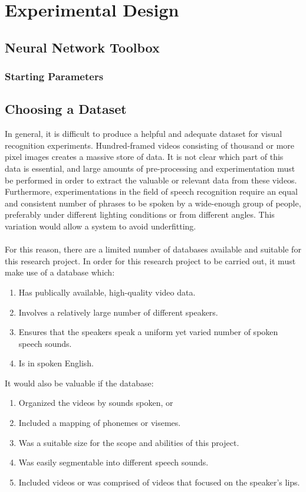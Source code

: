 \documentclass[12pt,twoside]{report}
\begin{document}
\chapter{Experimental Design}
	\section{Neural Network Toolbox}
		\subsection{Starting Parameters}
	\section{Choosing a Dataset}
In general, it is difficult to produce a helpful and adequate dataset for visual recognition experiments. Hundred-framed videos consisting of thousand or more pixel images creates a massive store of data. It is not clear which part of this data is essential, and large amounts of pre-processing and experimentation must be performed in order to extract the valuable or relevant data from these videos. Furthermore, experimentations in the field of speech recognition require an equal and consistent number of phrases to be spoken by a wide-enough group of people, preferably under different lighting conditions or from different angles. This variation would allow a system to avoid underfitting. 
\\ \\
For this reason, there are a limited number of databases available and suitable for this research project. In order for this research project to be carried out, it must make use of a database which:

\begin{enumerate}
	\item Has publically available, high-quality video data.
	\item Involves a relatively large number of different speakers.
	\item Ensures that the speakers speak a uniform yet varied number of spoken speech sounds.
	\item Is in spoken English.
\end{enumerate}

It would also be valuable if the database:
\begin{enumerate}
	\item Organized the videos by sounds spoken, or
	\item Included a mapping of phonemes or visemes.
	\item Was a suitable size for the scope and abilities of this project.
	\item Was easily segmentable into different speech sounds.
	\item Included videos or was comprised of videos that focused on the speaker's lips.
\end{enumerate}
\end{document}
